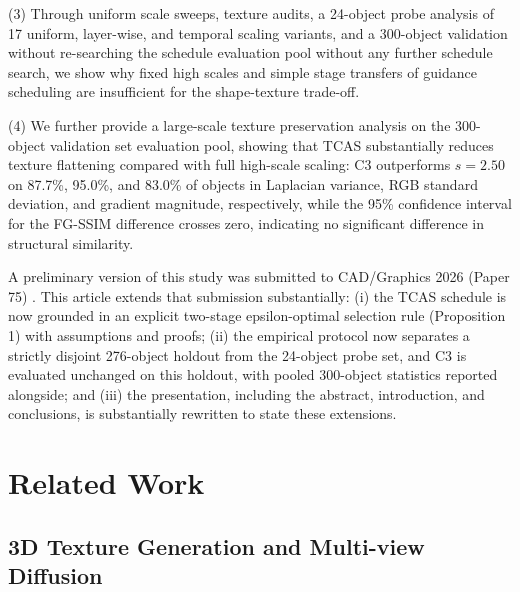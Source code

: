 \documentclass[times,twocolumn,final]{elsarticle}
\providecommand{\DIFadd}[1]{{\protect\color{blue} \sf #1}} %
\providecommand{\DIFdel}[1]{{\protect\color{red} \scriptsize #1}} %
\providecommand{\DIFaddbegin}{} %
\providecommand{\DIFaddend}{} %
\providecommand{\DIFdelbegin}{} %
\providecommand{\DIFdelend}{} %
\newcommand{\DIFscaledelfig}{0.5}
\newlength{\DIFdelgraphicswidth} %
\newlength{\DIFdelgraphicsheight} %
\newcommand{\DIFaddincludegraphics}[2][]{{\color{blue}\fbox{\DIFOincludegraphics[#1]{#2}}}} %
\newcommand{\DIFdelincludegraphics}[2][]{%
\sbox{\DIFdelgraphicsbox}{\DIFOincludegraphics[#1]{#2}}%
\settoboxwidth{\DIFdelgraphicswidth}{\DIFdelgraphicsbox} %
\settoboxtotalheight{\DIFdelgraphicsheight}{\DIFdelgraphicsbox} %
\scalebox{\DIFscaledelfig}{%
\parbox[b]{\DIFdelgraphicswidth}{\usebox{\DIFdelgraphicsbox}\\[-\baselineskip] \rule{\DIFdelgraphicswidth}{0em}}\llap{\resizebox{\DIFdelgraphicswidth}{\DIFdelgraphicsheight}{%
\setlength{\unitlength}{\DIFdelgraphicswidth}%
\begin{picture}(1,1)%
\thicklines\linethickness{2pt} %
{\color[rgb]{1,0,0}\put(0,0){\framebox(1,1){}}}%
{\color[rgb]{1,0,0}\put(0,0){\line( 1,1){1}}}%
{\color[rgb]{1,0,0}\put(0,1){\line(1,-1){1}}}%
\end{picture}%
}\hspace*{3pt}}} %
} %
\DeclareRobustCommand{\DIFaddbegin}{\DIFOaddbegin \let\includegraphics\DIFaddincludegraphics} %
\DeclareRobustCommand{\DIFaddend}{\DIFOaddend \let\includegraphics\DIFOincludegraphics} %
\DeclareRobustCommand{\DIFdelbegin}{\DIFOdelbegin \let\includegraphics\DIFdelincludegraphics} %
\DeclareRobustCommand{\DIFdelend}{\DIFOaddend \let\includegraphics\DIFOincludegraphics} %
\begin{document}
(3) Through uniform scale sweeps, texture audits, a 24-object probe analysis of 17 uniform, layer-wise, and temporal scaling variants, and a 300-object \DIFdelbegin \DIFdel{validation without re-searching the schedule }\DIFdelend \DIFaddbegin \DIFadd{evaluation pool without any further schedule search}\DIFaddend , we show why fixed high scales and simple stage transfers of guidance scheduling are insufficient for the shape-texture trade-off.

(4) We further provide a large-scale texture preservation analysis on the 300-object \DIFdelbegin \DIFdel{validation set}\DIFdelend \DIFaddbegin \DIFadd{evaluation pool}\DIFaddend , showing that TCAS substantially reduces texture flattening compared with full high-scale scaling: C3 outperforms $s = 2.50$ on 87.7\%, 95.0\%, and 83.0\% of objects in Laplacian variance, RGB standard deviation, and gradient magnitude, respectively, while the 95\% confidence interval for the FG-SSIM difference crosses zero, indicating no significant difference in structural similarity.

\DIFaddbegin \DIFadd{A preliminary version of this study was submitted to CAD/Graphics 2026 (Paper 75) \cite{cadgraphics2026p75}. This article extends that submission substantially: (i) the TCAS schedule is now grounded in an explicit two-stage epsilon-optimal selection rule (Proposition 1) with assumptions and proofs; (ii) the empirical protocol now separates a strictly disjoint 276-object holdout from the 24-object probe set, and C3 is evaluated unchanged on this holdout, with pooled 300-object statistics reported alongside; and (iii) the presentation, including the abstract, introduction, and conclusions, is substantially rewritten to state these extensions.
}

\DIFaddend \section{Related Work}
\label{sec:related}

\subsection{3D Texture Generation and Multi-view Diffusion}
\label{subsec:3dtex}
\end{document}
